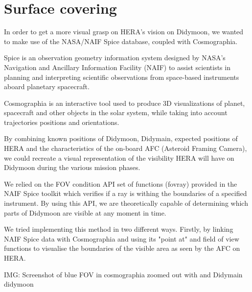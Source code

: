 \section{Surface covering}
\label{sec:9}

In order to get a more visual grasp on HERA's vision on Didymoon, we wanted to make use of the NASA/NAIF Spice database, coupled with Cosmographia. 

Spice is an observation geometry information system designed by NASA's Navigation and Ancillary Information Facility (NAIF) to assist scientists in planning and interpreting scientific observations from space-based instruments aboard planetary spacecraft. 

Cosmographia is an interactive tool used to produce 3D visualizations of planet, spacecraft and other objects in the solar system, while taking into account trajectories positions and orientations. 

By combining known positions of Didymoon, Didymain, expected positions of HERA and the characteristics of the on-board AFC (Asteroid Framing Camera), we could recreate a visual representation of the visibility HERA will have on Didymoon during the various mission phases. 

We relied on the FOV condition API set of functions (fovray) provided in the NAIF Spice toolkit which verifies if a ray is withing the boundaries of a specified instrument. By using this API, we are theoretically capable of determining which parts of Didymoon are visible at any moment in time. 

We tried implementing this method in two different ways. Firstly, by linking NAIF Spice data with Cosmographia and using its "point at" and field of view functions to visualise the boundaries of the visible area as seen by the AFC on HERA. 

IMG: Screenshot of blue FOV in cosmographia  zoomed out with and Didymain didymoon

